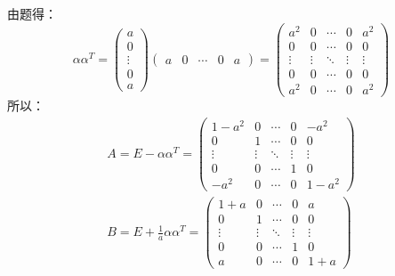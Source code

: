 \documentclass[a4paper]{report}
\begin{document}
\begin{jie}
由题得：
\begin{equation*}
\alpha\alpha^T=
\begin{pmatrix}
a\\ 0\\ \vdots\\ 0\\ a
\end{pmatrix}\begin{pmatrix}
a& 0&\cdots& 0&a
\end{pmatrix}=
\begin{pmatrix}
a^2&0&\cdots&0&a^2\\
0&0&\cdots&0&0\\
\vdots&\vdots&\ddots&\vdots&\vdots\\
0&0&\cdots&0&0\\
a^2&0&\cdots&0&a^2
\end{pmatrix}
\end{equation*}
所以：
\begin{gather*}
A=E-\alpha\alpha^T=
\begin{pmatrix}
1-a^2&0&\cdots&0&-a^2\\
0&1&\cdots&0&0\\
\vdots&\vdots&\ddots&\vdots&\vdots\\
0&0&\cdots&1&0\\
-a^2&0&\cdots&0&1-a^2
\end{pmatrix}\\
B=E+\frac{1}{a}\alpha\alpha^T=
\begin{pmatrix}
1+a&0&\cdots&0&a\\
0&1&\cdots&0&0\\
\vdots&\vdots&\ddots&\vdots&\vdots\\
0&0&\cdots&1&0\\
a&0&\cdots&0&1+a
\end{pmatrix}
\end{gather*}


\end{jie}
\end{document}
